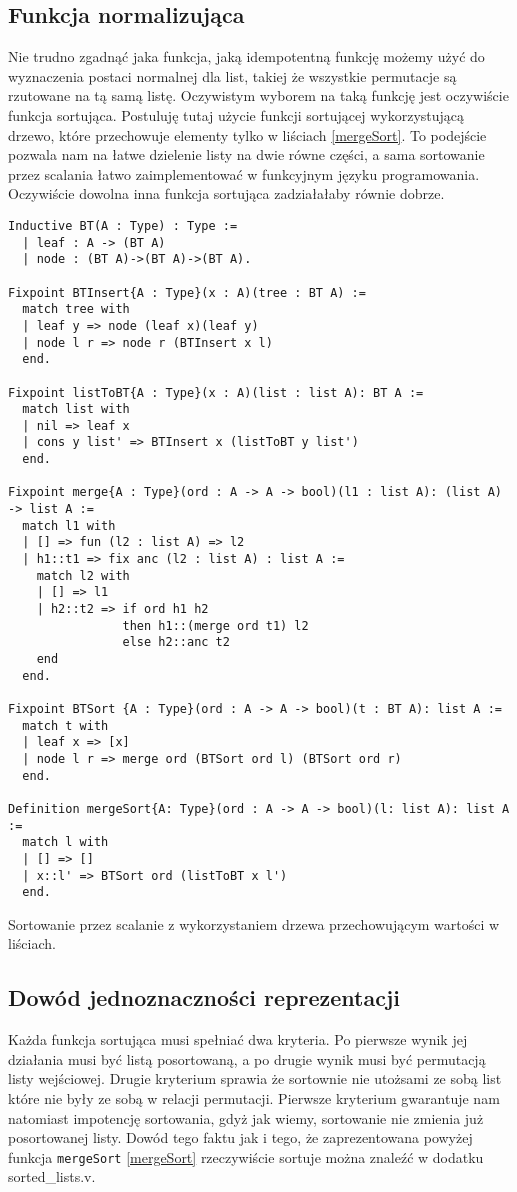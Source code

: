 \subsection{Funkcja normalizująca}
Nie trudno zgadnąć jaka funkcja, jaką idempotentną funkcję możemy użyć do wyznaczenia postaci normalnej dla list, takiej że wszystkie permutacje są rzutowane na tą samą listę. Oczywistym wyborem na taką funkcję jest oczywiście funkcja sortująca. Postuluję tutaj użycie funkcji sortującej wykorzystującą drzewo, które przechowuje elementy tylko w liściach \ref{mergeSort}. To podejście pozwala nam na łatwe dzielenie listy na dwie równe części, a sama sortowanie przez scalania łatwo zaimplementować w funkcyjnym języku programowania. Oczywiście dowolna inna funkcja sortująca zadziałałaby równie dobrze.
\begin{code}
\begin{verbatim}
Inductive BT(A : Type) : Type :=
  | leaf : A -> (BT A)
  | node : (BT A)->(BT A)->(BT A).

Fixpoint BTInsert{A : Type}(x : A)(tree : BT A) :=
  match tree with
  | leaf y => node (leaf x)(leaf y)
  | node l r => node r (BTInsert x l)
  end.

Fixpoint listToBT{A : Type}(x : A)(list : list A): BT A :=
  match list with
  | nil => leaf x
  | cons y list' => BTInsert x (listToBT y list')
  end.

Fixpoint merge{A : Type}(ord : A -> A -> bool)(l1 : list A): (list A) -> list A :=
  match l1 with
  | [] => fun (l2 : list A) => l2
  | h1::t1 => fix anc (l2 : list A) : list A :=
    match l2 with
    | [] => l1
    | h2::t2 => if ord h1 h2 
                then h1::(merge ord t1) l2
                else h2::anc t2
    end
  end.

Fixpoint BTSort {A : Type}(ord : A -> A -> bool)(t : BT A): list A :=
  match t with
  | leaf x => [x]
  | node l r => merge ord (BTSort ord l) (BTSort ord r)
  end. 

Definition mergeSort{A: Type}(ord : A -> A -> bool)(l: list A): list A :=
  match l with
  | [] => []
  | x::l' => BTSort ord (listToBT x l')
  end.
\end{verbatim}
\caption{Sortowanie przez scalanie z wykorzystaniem drzewa przechowującym wartości w liściach.}
\label{mergeSort}
\end{code}
\subsection{Dowód jednoznaczności reprezentacji}
Każda funkcja sortująca musi spełniać dwa kryteria. Po pierwsze wynik jej działania musi być listą posortowaną, a po drugie wynik musi być permutacją listy wejściowej. Drugie kryterium sprawia że sortownie nie utożsami ze sobą list które nie były ze sobą w relacji permutacji. Pierwsze kryterium gwarantuje nam natomiast impotencję sortowania, gdyż jak wiemy, sortowanie nie zmienia już posortowanej listy. Dowód tego faktu jak i tego, że zaprezentowana powyżej funkcja \texttt{mergeSort} \ref{mergeSort} rzeczywiście sortuje można znaleźć w dodatku sorted\_lists.v.

